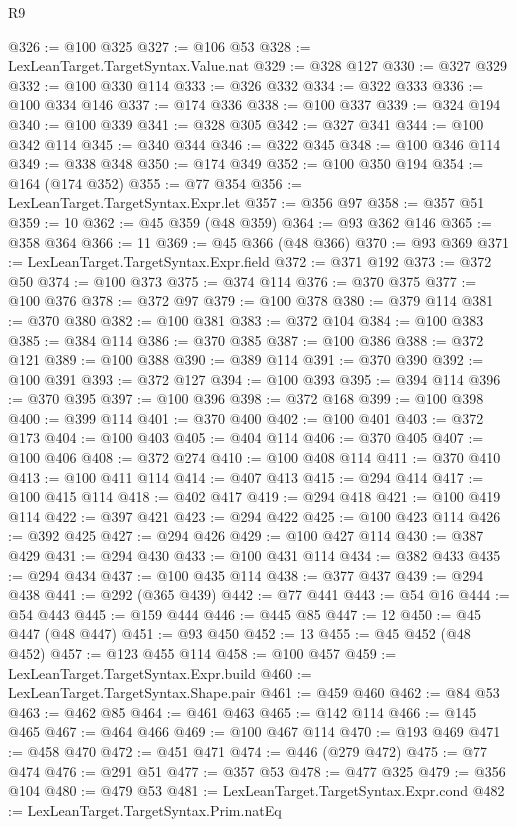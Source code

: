 \begin{lexlean}{R9}
\begin{coremodule}
{{{{{{{{{{{{{{{{{{{{{{{{{{{{{{{{{{{{{{{{{{{{{{{{{{{{{{{{{{{{{{{{{{{{{{{{{{{{{{{{{{{{{{{{{{{{{{{{{{{{{{{{{{{{@326 := @100 @325
@327 := @106 @53
@328 := LexLeanTarget.TargetSyntax.Value.nat
@329 := @328 @127
@330 := @327 @329
@332 := @100 @330 @114
@333 := @326 @332
@334 := @322 @333
@336 := @100 @334 @146
@337 := @174 @336
@338 := @100 @337
@339 := @324 @194
@340 := @100 @339
@341 := @328 @305
@342 := @327 @341
@344 := @100 @342 @114
@345 := @340 @344
@346 := @322 @345
@348 := @100 @346 @114
@349 := @338 @348
@350 := @174 @349
@352 := @100 @350 @194
@354 := @164 (@174 @352)
@355 := @77 @354
@356 := LexLeanTarget.TargetSyntax.Expr.let
@357 := @356 @97
@358 := @357 @51
@359 := 10
@362 := @45 @359 (@48 @359)
@364 := @93 @362 @146
@365 := @358 @364
@366 := 11
@369 := @45 @366 (@48 @366)
@370 := @93 @369
@371 := LexLeanTarget.TargetSyntax.Expr.field
@372 := @371 @192
@373 := @372 @50
@374 := @100 @373
@375 := @374 @114
@376 := @370 @375
@377 := @100 @376
@378 := @372 @97
@379 := @100 @378
@380 := @379 @114
@381 := @370 @380
@382 := @100 @381
@383 := @372 @104
@384 := @100 @383
@385 := @384 @114
@386 := @370 @385
@387 := @100 @386
@388 := @372 @121
@389 := @100 @388
@390 := @389 @114
@391 := @370 @390
@392 := @100 @391
@393 := @372 @127
@394 := @100 @393
@395 := @394 @114
@396 := @370 @395
@397 := @100 @396
@398 := @372 @168
@399 := @100 @398
@400 := @399 @114
@401 := @370 @400
@402 := @100 @401
@403 := @372 @173
@404 := @100 @403
@405 := @404 @114
@406 := @370 @405
@407 := @100 @406
@408 := @372 @274
@410 := @100 @408 @114
@411 := @370 @410
@413 := @100 @411 @114
@414 := @407 @413
@415 := @294 @414
@417 := @100 @415 @114
@418 := @402 @417
@419 := @294 @418
@421 := @100 @419 @114
@422 := @397 @421
@423 := @294 @422
@425 := @100 @423 @114
@426 := @392 @425
@427 := @294 @426
@429 := @100 @427 @114
@430 := @387 @429
@431 := @294 @430
@433 := @100 @431 @114
@434 := @382 @433
@435 := @294 @434
@437 := @100 @435 @114
@438 := @377 @437
@439 := @294 @438
@441 := @292 (@365 @439)
@442 := @77 @441
@443 := @54 @16
@444 := @54 @443
@445 := @159 @444
@446 := @445 @85
@447 := 12
@450 := @45 @447 (@48 @447)
@451 := @93 @450
@452 := 13
@455 := @45 @452 (@48 @452)
@457 := @123 @455 @114
@458 := @100 @457
@459 := LexLeanTarget.TargetSyntax.Expr.build
@460 := LexLeanTarget.TargetSyntax.Shape.pair
@461 := @459 @460
@462 := @84 @53
@463 := @462 @85
@464 := @461 @463
@465 := @142 @114
@466 := @145 @465
@467 := @464 @466
@469 := @100 @467 @114
@470 := @193 @469
@471 := @458 @470
@472 := @451 @471
@474 := @446 (@279 @472)
@475 := @77 @474
@476 := @291 @51
@477 := @357 @53
@478 := @477 @325
@479 := @356 @104
@480 := @479 @53
@481 := LexLeanTarget.TargetSyntax.Expr.cond
@482 := LexLeanTarget.TargetSyntax.Prim.natEq
}}}}}}}}}}}}}}}}}}}}}}}}}}}}}}}}}}}}}}}}}}}}}}}}}}}}}}}}}}}}}}}}}}}}}}}}}}}}}}}}}}}}}}}}}}}}}}}}}}}}}}}}}}}}
\end{coremodule}
\end{lexlean}

